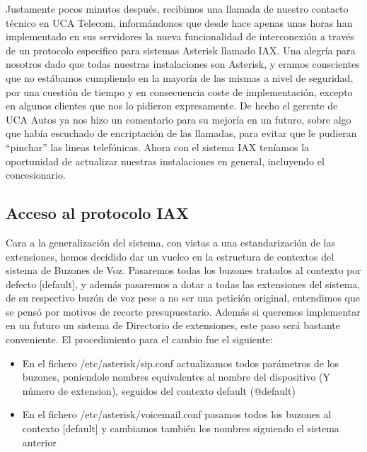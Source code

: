 Justamente pocos minutos después, recibimos una llamada de nuestro contacto técnico en UCA Telecom, informándonos que desde hace apenas unas horas han implementado en sus servidores la nueva funcionalidad de interconexión a través de un protocolo especifico para sistemas Asterisk llamado IAX. Una alegría para nosotros dado que todas nuestras instalaciones son Asterisk, y eramos conscientes que no estábamos cumpliendo en la mayoría de las mismas a nivel de seguridad, por una cuestión de tiempo y en consecuencia coste de implementación, excepto en algunos clientes que nos lo pidieron expresamente. De hecho el gerente de UCA Autos ya nos hizo un comentario para su mejoría en un futuro, sobre algo que había escuchado de encriptación de las llamadas, para evitar que le pudieran ``pinchar'' las lineas telefónicas. Ahora con el sistema IAX teníamos la oportunidad de actualizar nuestras instalaciones en general, incluyendo el concesionario.

\newpage

\color[rgb]{0,0,0}

\subsection{Acceso al protocolo IAX}

Cara a la generalización del sistema, con vistas a una estandarización de las extensiones, hemos decidido dar un vuelco en la estructura de contextos del sistema de Buzones de Voz. Pasaremos todas los buzones tratados al contexto por defecto [default], y además pasaremos a dotar a todas las extensiones del sistema, de su respectivo buzón de voz pese a no ser una petición original, entendimos que se pensó por motivos de recorte presupuestario. Además si queremos implementar en un futuro un sistema de Directorio de extensiones, este paso será bastante conveniente. El procedimiento para el cambio fue el siguiente:

\begin{itemize}

\item En el fichero /etc/asterisk/sip.conf actualizamos todos parámetros de los buzones, poniendole nombres equivalentes al nombre del dispositivo (Y número de extension), seguidos del contexto default (@default)
\item En el fichero /etc/asterisk/voicemail.conf pasamos todos los buzones al contexto [default] y cambiamos también los nombres siguiendo el sistema anterior

\end{itemize}

